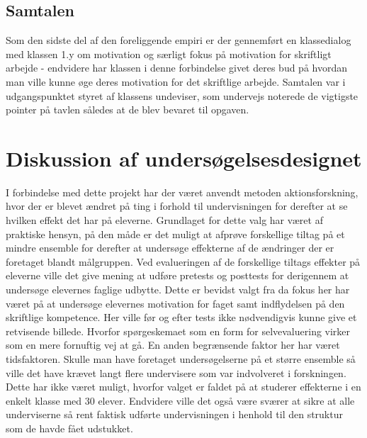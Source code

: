 \subsection*{Samtalen}
Som den sidste del af den foreliggende empiri er der gennemført en klassedialog med klassen 1.y om motivation og særligt fokus på motivation for skriftligt arbejde - endvidere har klassen i denne forbindelse givet deres bud på hvordan man ville kunne øge deres motivation for det skriftlige arbejde. Samtalen var i udgangspunktet styret af klassens undeviser, som undervejs noterede de  vigtigste pointer på tavlen således at de blev bevaret til opgaven.

\section{Diskussion af undersøgelsesdesignet}
\label{sec:des}
I forbindelse med dette projekt har der været anvendt metoden aktionsforskning, hvor der er blevet ændret på ting i forhold til undervisningen for derefter at se hvilken effekt det har på eleverne. Grundlaget for dette valg har været af praktiske hensyn, på den måde er det muligt at afprøve forskellige tiltag på et mindre ensemble for derefter at undersøge effekterne af de ændringer der er foretaget blandt målgruppen. Ved evalueringen af de forskellige tiltags effekter på eleverne ville det give mening at udføre pretests og posttests for derigennem at undersøge elevernes faglige udbytte. Dette er bevidst valgt fra da fokus her har været på at undersøge elevernes motivation for faget samt indflydelsen på den skriftlige kompetence. Her ville før og efter tests ikke nødvendigvis kunne give et retvisende billede. Hvorfor spørgeskemaet som en form for selvevaluering virker som en mere fornuftig vej at gå.  En anden begrænsende faktor her har været tidsfaktoren. Skulle man have foretaget undersøgelserne på et større ensemble så ville det have krævet langt flere undervisere som var indvolveret i forskningen. Dette har ikke været muligt, hvorfor valget er faldet på at studerer effekterne i en enkelt klasse med 30 elever. Endvidere ville det også være sværer at sikre at alle underviserne så rent faktisk udførte undervisningen i henhold til den struktur som de havde fået udstukket. 
